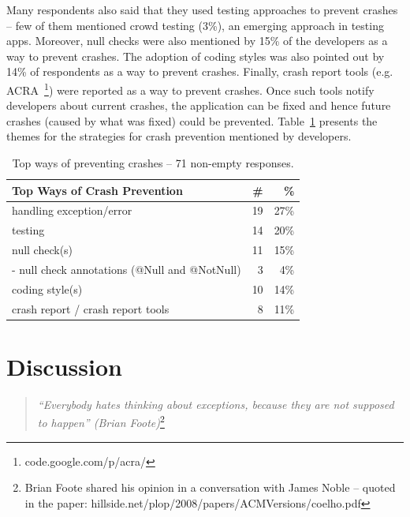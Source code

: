 Many respondents also said that they used testing approaches to prevent crashes -- few of them mentioned crowd testing (3\%), an emerging approach in testing apps. Moreover, null checks were also mentioned by 15\% of the developers as a way to prevent crashes.
The adoption of coding styles was also pointed out by 14\% of respondents as a way to prevent crashes. Finally, crash report tools (e.g. ACRA~\footnote{code.google.com/p/acra/}) were reported as a way to prevent crashes. Once such tools notify developers about current crashes, the application can be fixed and hence future crashes (caused by what was fixed) could be prevented. Table~\ref{tab:topprevent} presents the themes for the strategies for crash prevention mentioned by developers.

\bigskip


\bigskip

\begin{table}
\scriptsize
\centering
\begin{tabular}{lrr}
\hline
\bfseries{Top Ways of Crash Prevention} & \bfseries{\#} & \bfseries{\%} \\
\hline
handling exception/error  & 19 &	27\% \\
testing &	14 &	20\% \\
null check(s) &	11 &	15\% \\
- null check annotations (@Null and @NotNull)	& 3 & 	4\% \\
coding style(s)	& 10 &	14\% \\
crash report / crash report tools &	8	& 11\% \\
\hline
\end{tabular}
\caption{Top ways of preventing crashes -- 71 non-empty responses. }
\label{tab:topprevent}
\end{table}

\bigskip

\section{Discussion}
\label{sec:disc}

\begin{quotation}
\noindent
 \emph{``Everybody hates thinking about exceptions, because they are not supposed to happen''
  (Brian Foote)}\footnote{Brian Foote shared his opinion in a conversation with James Noble -- quoted in the paper: hillside.net/plop/2008/papers/ACMVersions/coelho.pdf}
\end{quotation}

